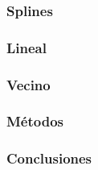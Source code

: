 
\subsubsection{Splines}

\subsubsection{Lineal}

\subsubsection{Vecino}

\subsubsection{M\'etodos}

\subsubsection{Conclusiones}

